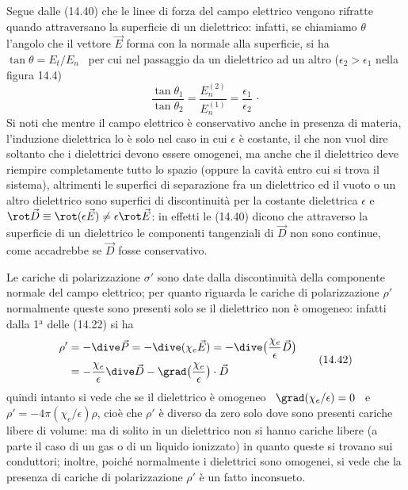 Segue dalle (14.40) che le linee di forza del campo elettrico vengono rifratte
quando attraversano la superficie di un dielettrico: infatti, se chiamiamo
$\theta$ l'angolo che il vettore $\vec E$ forma con la normale alla superficie,
si ha \ $\tan\theta=E_t/E_n$ \ per cui nel passaggio da un dielettrico ad un
altro ($\epsilon_2>\epsilon_1$ nella figura 14.4)
\begin{equation}
  \frac{\tan\theta_1}{\tan\theta_2}
  =\frac{E_n^{(2)}}{E_n^{(1)}}=\frac{\epsilon_1}{\epsilon_2}\,\cdot
  \tag{14.41}
\end{equation}
Si noti che mentre il campo elettrico \`e conservativo anche in presenza di
materia, l'induzione dielettrica lo \`e solo nel caso in cui $\epsilon$ \`e
costante, il che non vuol dire soltanto che i dielettrici devono essere
omogenei, ma anche che il dielettrico deve riempire completamente tutto lo
spazio (oppure la cavit\`a entro cui si trova il sistema), altrimenti le
superfici di separazione fra un dielettrico ed il vuoto o un altro dielettrico
sono superfici di discontinuit\`a per la costante dielettrica $\epsilon$ e
\ $\rot\vec D\equiv\rot(\epsilon\vec E)\ne\epsilon\rot\vec E$: in effetti le
(14.40) dicono che attraverso la superficie di un dielettrico le componenti
tangenziali di $\vec D$ non sono continue, come accadrebbe se $\vec D$ fosse
conservativo.

Le cariche di polarizzazione $\sigma'$ sono date dalla discontinuit\`a della
componente normale del campo elettrico; per quanto riguarda le cariche di
polarizzazione $\rho'$ normalmente queste sono presenti solo se il dielettrico
non \`e omogeneo: infatti dalla 1$^\mathrm{a}$ delle (14.22) si ha
\begin{equation}
  \begin{aligned}
    \rho'&=-\dive\vec P=-\dive(\chi_e\vec E)
    =-\dive\big(\frac{\chi_e}{\epsilon}\vec D\big)\\
    &=-\frac{\chi_e}{\epsilon}\dive\vec D
    -\grad\big(\frac{\chi_e}{\epsilon}\big)\cdot\vec D
  \end{aligned}
  \tag{14.42}
\end{equation}
quindi intanto si vede che se il dielettrico \`e omogeneo
\ $\grad(\chi_e/\epsilon)=0$ \ e \ $\rho'=-4\pi(\chi_e/\epsilon)\rho$, cio\`e
che $\rho'$ \`e diverso da zero solo dove sono presenti cariche libere di
volume: ma di solito in un dielettrico non si hanno cariche libere (a parte il
caso di un gas o di un liquido ionizzato) in quanto queste si trovano sui
conduttori; inoltre, poich\'e normalmente i dielettrici sono omogenei, si vede
che la presenza di cariche di polarizzazione $\rho'$ \`e un fatto inconsueto.

